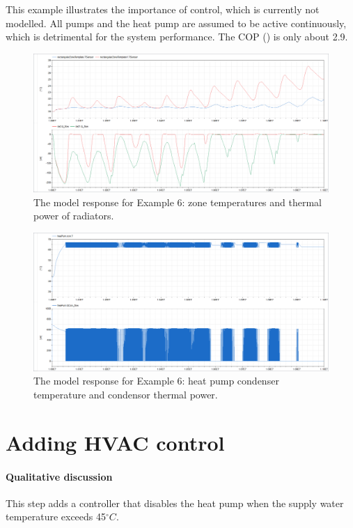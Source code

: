 \documentclass[10pt,a4paper]{article}
\begin{document}
This example illustrates the importance of control, which is currently not modelled.
All pumps and the heat pump are assumed to be active continuously, 
which is detrimental for the system performance.
The COP () is only about 2.9.


\begin{figure}[h]
\centering
\includegraphics[scale=0.28]{Example6.png}
\caption{The model response for Example 6: zone temperatures and thermal power of radiators.}
\label{fig:res1}
\end{figure}
\begin{figure}[h]
	\centering
	\includegraphics[scale=0.28]{Example6_bis.png}
	\caption{The model response for Example 6: heat pump condenser temperature and condensor thermal power.}
	\label{fig:res1_bis}
\end{figure}
\newpage

\section{Adding HVAC control}
\paragraph{Qualitative discussion}
This step adds a controller that disables the heat pump
when the supply water temperature exceeds 45$^{\circ}C$.
\end{document}
